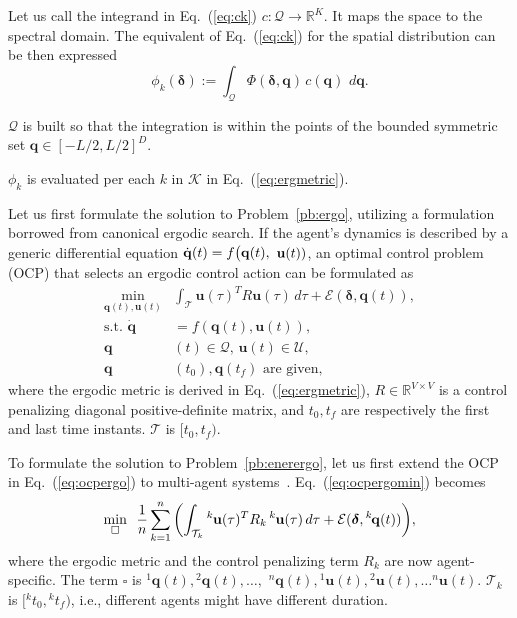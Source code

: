 \documentclass[letterpaper,10pt,conference,twoside]{IEEEtran}
\theoremstyle{definition}
\begin{document}
Let us call the integrand in Eq.~(\ref{eq:ck}) $c:\mathcal{Q}\longrightarrow \mathbb{R}^K$. It maps the space to the spectral domain. The equivalent of Eq.~(\ref{eq:ck}) for the spatial distribution can be then expressed
\begin{equation}\label{eq:phik}
  \phi_k(\boldsymbol{\delta}):=\int_{\mathcal{Q}} \Phi(\boldsymbol{\delta},\mathbf{q})\,c(\mathbf{q})\,\,d\mathbf{q}.
\end{equation}

$\mathcal{Q}$ is built so that the integration is within the points of the bounded symmetric set $\mathbf{q}\in[-L/2,L/2]^D$.

$\phi_k$ is evaluated per each $k$ in $\mathcal{K}$ in Eq.~(\ref{eq:ergmetric}).

Let us first formulate the solution to Problem~\ref{pb:ergo}, utilizing a formulation borrowed from canonical ergodic search.
If the agent's dynamics is described by a generic differential equation $\dot{\mathbf{q}}(t)=f\big({\small\mathbf{q}(t),}$ ${\small\mathbf{u}(t)})$, an optimal control problem (OCP) that selects an ergodic control action can be formulated as~\cite{ayvali2017ergodic}
\begin{subequations}\label{eq:ocpergo}\begin{align}
  \min_{\mathbf{q}(t),\mathbf{u}(t)}&\int_{\mathcal{T}}\mathbf{u}(\tau)^TR\mathbf{u}(\tau)\,d\tau+{\mathcal{E}(\boldsymbol{\delta},\mathbf{q}(t))},\label{eq:ocpergomin}\\
  \text{s.t. }\dot{\mathbf{q}}&=f(\mathbf{q}(t),\mathbf{u}(t)),\\
  \mathbf{q}&(t)\in\mathcal{Q},\,\mathbf{u}(t)\in\mathcal{U},\\
  \mathbf{q}&(t_0), \mathbf{q}(t_f)\text{ are given},\label{eq:ocpconsttotf}
\end{align}\end{subequations}
where the ergodic metric is derived in Eq.~(\ref{eq:ergmetric}), $R\in\mathbb{R}^{V\times V}$ is a control penalizing diagonal positive-definite matrix, and $t_0, t_f$ are respectively the first and last time instants. 
$\mathcal{T}$ is $[t_0, t_f)$.

To formulate the solution to Problem~\ref{pb:enerergo}, let us first extend the OCP in Eq.~(\ref{eq:ocpergo}) to multi-agent systems~\cite{coffin2022multi}. Eq.~(\ref{eq:ocpergomin}) becomes
\begin{equation}\label{eq:ocpergomulti}
  \min_{\square}\,\,\,{\frac{1}{n}\sum_{k=1}^{n}\left(\int_{\mathcal{T}_k}{}^k\hspace*{-.1ex}\mathbf{u}(\tau)^TR_k\,{}^k\hspace*{-.1ex}\mathbf{u}(\tau)\,d\tau+\mathcal{E}(\boldsymbol{\delta},{}^k\hspace*{-.2ex}\mathbf{q}(t))\right)},
\end{equation}
where the ergodic metric and the control penalizing term $R_k$ are now agent-specific. The term $\square$ is ${}^1\mathbf{q}(t),{}^2\mathbf{q}(t),\dots,$ ${}^n\mathbf{q}(t),{}^1\mathbf{u}(t),{}^2\mathbf{u}(t),\dots{}^n\mathbf{u}(t)$. $\mathcal{T}_k$ is $[{}^kt_0, {}^kt_f)$, i.e., different agents might have different duration.
\end{document}
